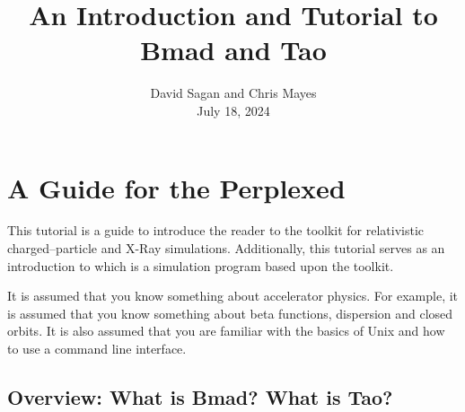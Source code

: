 \documentclass{hitec}     %
\title{An Introduction and Tutorial to Bmad and Tao}
\author{}
\date{David Sagan and Chris Mayes \\ July 18, 2024}
\newcommand{\Section}[1]{\section{#1}\vspace*{-1ex}}
\begin{document}
{}
\maketitle

\cleardoublepage
{}
{}
\tableofcontents

\newpage

\Section{A Guide for the Perplexed}
\label{s:guide}

This tutorial is a guide to introduce the reader to the \bmad toolkit for relativistic
charged--particle and X-Ray simulations. Additionally, this tutorial serves as an introduction
to \tao which is a simulation program based upon the \bmad toolkit.

It is assumed that you know something about accelerator physics. For example, it is assumed that
\reversemarginpar{}
you know something about beta functions, dispersion and closed orbits. It is also assumed that
you are familiar with the basics of Unix and how to use a command line interface.

\subsection{Overview: What is Bmad? What is Tao?}
\label{s:overview}
\end{document}
